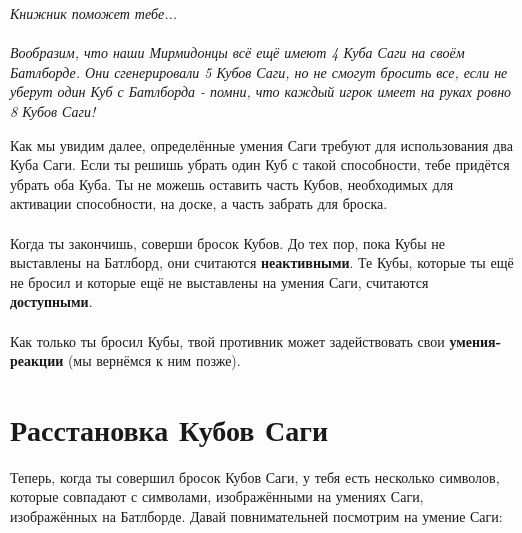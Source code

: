 \documentclass[a4paper,11pt,twoside]{article}
\begin{document}
\begingroup
\fontsize{15pt}{11pt}\selectfont
\textit{Книжник поможет тебе...}\\ \\
\fontsize{11pt}{11pt}\selectfont
\textit{Вообразим, что наши Мирмидонцы всё ещё имеют 4 Куба Саги на своём Батлборде. Они сгенерировали 5 Кубов Саги, но не смогут бросить все, если не уберут один Куб с Батлборда - помни, что каждый игрок имеет на руках ровно 8 Кубов Саги!}
\endgroup 

Как мы увидим далее, определённые умения Саги требуют для использования два Куба Саги. Если ты решишь убрать один Куб с такой способности, тебе придётся убрать оба Куба. Ты не можешь оставить часть Кубов, необходимых для активации способности, на доске, а часть забрать для броска. \\ \\ 
Когда ты закончишь, соверши бросок Кубов. До тех пор, пока Кубы не выставлены на Батлборд, они считаются \textbf{неактивными}. Те Кубы, которые ты ещё не бросил и которые ещё не выставлены на умения Саги, считаются \textbf{доступными}. \\ \\ 
Как только ты бросил Кубы, твой противник может задействовать свои \textbf{умения-реакции} (мы вернёмся к ним позже).

\section*{Расстановка Кубов Саги}

Теперь, когда ты совершил бросок Кубов Саги, у тебя есть несколько символов, которые совпадают с символами, изображёнными на умениях Саги, изображённых на Батлборде. Давай повнимательней посмотрим на умение Саги:
\end{document}
